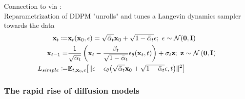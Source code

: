 \documentclass[./presentation.tex]{subfiles}
\begin{document}
\begin{frame}[label=diffusion]
{{  Connection to \cite{niuPermutationInvariantGraph2020b} via \cite{songGenerativeModelingEstimating2019b}:\\ Reparametrization of DDPM \citep{hoDenoisingDiffusionProbabilistic2020f} "unrolls" and tunes a Langevin dynamics sampler towards the data
  \begin{align}
    \rvx_{t}\coloneqq&\func{\rvx_t}{\rvx_0,\mathbf{\epsilon}}=\sqrt{\bar{\alpha}_t}\rvx_0+\sqrt{1-\bar{\alpha}_t}\mathbf{\epsilon};\ \mathbf{\epsilon}\sim\func{\mathcal{N}}{\mathbf{0},\rvI}\nonumber\\
    \rvx_{t-1}=&\frac{1}{\sqrt{\alpha_t}}\left(\rvx_t-\frac{\beta_t}{\sqrt{1-\bar{\alpha}_t}}\func{\mathbf{\epsilon}_\theta}{\rvx_t,t}\right)+\sigma_t\rvz;\ \rvz\sim\mathcal{N}\left(\mathbf{0},\rvI \right)\nonumber\\
    L_{simple}\coloneqq&\mathbb{E}_{t,\rvx_0,\mathbf{\epsilon}}\bigl[ \Vert \mathbf{\epsilon}-\func{\mathbf{\epsilon}_\theta}{\sqrt{\bar{\alpha}_t}\rvx_0+\sqrt{1-\bar{\alpha}_t}\mathbf{\epsilon},t} \Vert^2 \bigr]\nonumber
  \end{align}
}
}
\end{frame}
\begin{frame}[label=diffusion,t]
  \frametitle{The rapid rise of diffusion models}
\end{frame}
\end{document}
